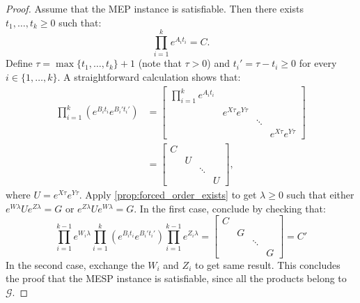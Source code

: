 \begin{proof}
Assume that the MEP instance is satisfiable. Then there exists $t_1,\ldots,t_k\geqslant0$ such that:
\[\prod_{i=1}^ke^{A_it_i}=C.\]
Define $\tau=\max\{t_1,\ldots,t_k\}+1$ (note that $\tau>0$) and $t_i'=\tau-t_i\geqslant0$ for every $i\in\{1,\ldots,k\}$.
A straightforward calculation shows that:
\begin{align*}
\prod_{i=1}^k\left(e^{B_it_i}e^{B_i't_i'}\right)
    &=\begin{bmatrix}\prod_{i=1}^ke^{A_it_i}&&&\\&e^{X\tau}e^{Y\tau}&&\\&&\ddots&\\&&&e^{X\tau}e^{Y\tau}\end{bmatrix}\\
    &=\begin{bmatrix}C&&&\\&U&&\\&&\ddots&\\&&&U\end{bmatrix},
\end{align*}
where $U=e^{X\tau}e^{Y\tau}$. Apply \cref{prop:forced_order_exists} to get $\lambda\geqslant0$
such that either $e^{W\lambda}Ue^{Z\lambda}=G$ or $e^{Z\lambda}Ue^{W\lambda}=G$. In the first case, conclude by
checking that:
\[
\prod_{i=1}^{k-1}e^{W_i\lambda}\prod_{i=1}^k\left(e^{B_it_i}e^{B_i't_i'}\right)\prod_{i=1}^{k-1}e^{Z_i\lambda}
    =\begin{bmatrix}C&&&\\&G&&\\&&\ddots&\\&&&G\end{bmatrix}=C'
\]
In the second case, exchange the $W_i$ and $Z_i$ to get same result. This concludes the proof that
the MESP instance is satisfiable, since all the products belong to $\mathcal{G}$.


\end{proof}
